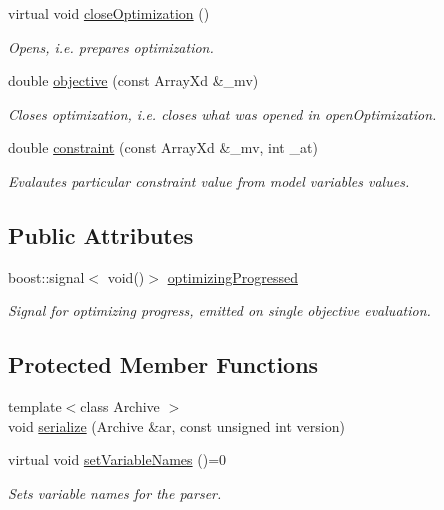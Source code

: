 \begin{DoxyCompactItemize}
\item 
virtual void \hyperlink{class_go_s_u_m_1_1_c_parser_optimization_problem_aa750bd3725ca5e71d8ce9901e78661a8}{close\-Optimization} ()
\begin{DoxyCompactList}\small\item\em Opens, i.\-e. prepares optimization. \end{DoxyCompactList}\item 
double \hyperlink{class_go_s_u_m_1_1_c_parser_optimization_problem_a8ab9a986329b04402af2a25ee19c9fd4}{objective} (const Array\-Xd \&\-\_\-mv)
\begin{DoxyCompactList}\small\item\em Closes optimization, i.\-e. closes what was opened in open\-Optimization. \end{DoxyCompactList}\item 
double \hyperlink{class_go_s_u_m_1_1_c_parser_optimization_problem_a90d550681fe3ef512822cfa9598eb5b0}{constraint} (const Array\-Xd \&\-\_\-mv, int \-\_\-at)
\begin{DoxyCompactList}\small\item\em Evalautes particular constraint value from model variables values. \end{DoxyCompactList}\end{DoxyCompactItemize}
\subsection*{Public Attributes}
\begin{DoxyCompactItemize}
\item 
boost\-::signal$<$ void()$>$ \hyperlink{class_go_s_u_m_1_1_c_parser_optimization_problem_aab0e689caaf0806fc8ebbe45f9f7861c}{optimizing\-Progressed}
\begin{DoxyCompactList}\small\item\em Signal for optimizing progress, emitted on single objective evaluation. \end{DoxyCompactList}\end{DoxyCompactItemize}
\subsection*{Protected Member Functions}
\begin{DoxyCompactItemize}
\item 
{\footnotesize template$<$class Archive $>$ }\\void \hyperlink{class_go_s_u_m_1_1_c_parser_optimization_problem_ae04362457ca2031eb85373131d8bbd12}{serialize} (Archive \&ar, const unsigned int version)
\item 
virtual void \hyperlink{class_go_s_u_m_1_1_c_parser_optimization_problem_a4d5c16683fc5feed6ed58c02206fd14b}{set\-Variable\-Names} ()=0
\begin{DoxyCompactList}\small\item\em Sets variable names for the parser. \end{DoxyCompactList}\end{DoxyCompactItemize}
